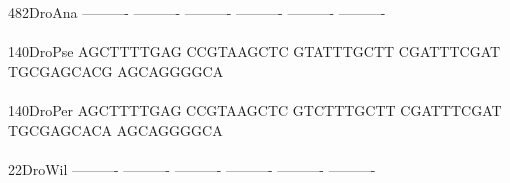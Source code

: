 \documentclass[11pt,twoside,reqno,a4paper]{article}
\begin{document}
{482\hspace*{2\charwidth}DroAna	----------	----------	----------	----------	----------	----------	\\
\hspace*{5\charwidth}\hspace*{7\charwidth}\hspace*{1\charwidth}\hspace*{1\charwidth}\hspace*{1\charwidth}\hspace*{1\charwidth}\hspace*{1\charwidth}\hspace*{1\charwidth}\\
140\hspace*{2\charwidth}DroPse	AGCTTTTGAG	CCGTAAGCTC	GTATTTGCTT	CGATTTCGAT	TGCGAGCACG	AGCAGGGGCA	\\
\hspace*{5\charwidth}\hspace*{7\charwidth}\hspace*{1\charwidth}\hspace*{1\charwidth}\hspace*{1\charwidth}\hspace*{1\charwidth}\hspace*{1\charwidth}\hspace*{1\charwidth}\\
140\hspace*{2\charwidth}DroPer	AGCTTTTGAG	CCGTAAGCTC	GTCTTTGCTT	CGATTTCGAT	TGCGAGCACA	AGCAGGGGCA	\\
\hspace*{5\charwidth}\hspace*{7\charwidth}\hspace*{1\charwidth}\hspace*{1\charwidth}\hspace*{1\charwidth}\hspace*{1\charwidth}\hspace*{1\charwidth}\hspace*{1\charwidth}\\
22\hspace*{3\charwidth}DroWil	----------	----------	----------	----------	----------	----------	\\
\hspace*{5\charwidth}\hspace*{7\charwidth}\hspace*{1\charwidth}\hspace*{1\charwidth}\hspace*{1\charwidth}\hspace*{1\charwidth}\hspace*{1\charwidth}\hspace*{1\charwidth}\\
}
\end{document}
